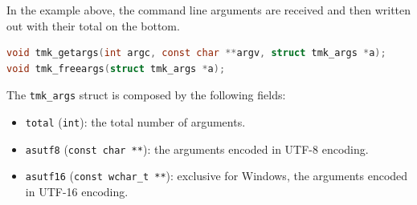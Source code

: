 \documentclass{report}
\begin{document}
In the example above, the command line arguments are received and then written out with their total on the bottom.
\begin{lstlisting}[language=c,caption=the declarations of the arguments function.]
void tmk_getargs(int argc, const char **argv, struct tmk_args *a);
void tmk_freeargs(struct tmk_args *a);
\end{lstlisting}

The \texttt{tmk\_args} struct is composed by the following fields:
\begin{itemize}
  \item \texttt{total} (\texttt{int}): the total number of arguments.
  \item \texttt{asutf8} (\texttt{const char **}): the arguments encoded in UTF-8 encoding.
  \item \texttt{asutf16} (\texttt{const wchar\_t **}): exclusive for Windows, the arguments encoded in UTF-16 encoding.
\end{itemize}
\end{document}
